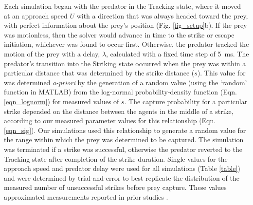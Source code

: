 \documentclass[]{rsos}%
\begin{document}
Each simulation began with the predator in the Tracking state, where it moved at an approach speed $U$ with a direction that was always headed toward the prey, with perfect information about the prey's position (Fig. \ref{fig_setup}b). 
If the prey was motionless, then the solver would advance in time to the strike or escape initiation, whichever was found to occur first.
Otherwise, the predator tracked the motion of the prey with a delay, $\lambda$, calculated with a fixed time step of \SI{5}{\ms}.  
The predator's transition into the Striking state occurred when the prey was within a particular distance that was determined by the strike distance ($s$). 
This value for was determined \textit{a-priori} by the generation of a random value (using the `random' function in MATLAB) from the log-normal probability-density function (Eqn. \ref{eqn_lognorm}) for measured values of $s$.
The capture probability for a particular strike depended on the distance between the agents in the middle of a strike, according to our measured parameter values for this relationship (Eqn. \ref{eqn_sig}).
Our simulations used this relationship to generate a random value for the range within which the prey was determined to be captured.
The simulation was terminated if a strike was successful, otherwise the predator reverted to the Tracking state after completion of the strike duration.
Single values for the approach speed and predator delay were used for all simulations (Table \ref{table}) and were determined by trial-and-error to best replicate the distribution of the measured number of unsuccessful strikes before prey capture. 
These values approximated measurements reported in prior studies \cite{McHenry:2005tc, Stewart:2013bha}. 
\end{document}
